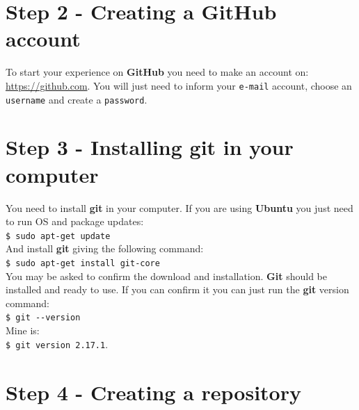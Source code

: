 \documentclass[12pt,a4paper,titlepage,brazil]{article}
\begin{document}

\section{Step 2 - Creating a GitHub account}

To start your experience on {\bf GitHub} you need to make an account on:
\url{https://github.com}. You will just need to inform your \texttt{e-mail} account, choose an \texttt{username} and create a \texttt{password}.


\section{Step 3 - Installing git in your computer}

You need to install {\bf git} in your computer. If you are using {\bf Ubuntu} you just need to run OS and package updates:\\

\texttt{\$ sudo apt-get update}\\

And install {\bf git} giving the following command:\\

\texttt{\$ sudo apt-get install git-core}\\

You may be asked to confirm the download and installation. {\bf Git} should be installed and ready to use. If you can confirm it you can just run the {\bf git} version command:\\

\texttt{\$ git -\hspace{0.01cm}-version}\\

Mine is:\\

\texttt{\$ git version 2.17.1}.


\section{Step 4 - Creating a repository}
\end{document}
